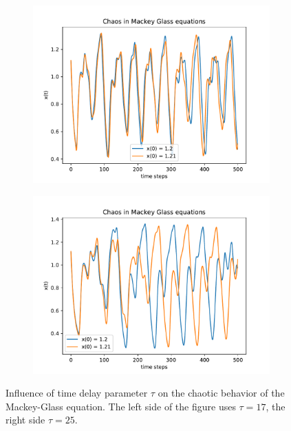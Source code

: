 \documentclass{article}
\begin{document}
\begin{figure}
    \centering
    \begin{subfigure}{.5\textwidth}
        \centering
        \includegraphics[width=\linewidth]{figures/mg_chaos_17.pdf}
    \end{subfigure}
    \hspace{-6mm}
    \begin{subfigure}{.5\textwidth}
        \centering
        \includegraphics[width=\linewidth]{figures/mg_chaos_25.pdf}
    \end{subfigure}
    \caption{Influence of time delay parameter $\tau$ on the chaotic behavior of
        the Mackey-Glass equation. The left side of the figure uses $\tau = 17$,
        the right side $\tau = 25$.}
    \label{fig:mackey_chaos}
\end{figure}
\end{document}
